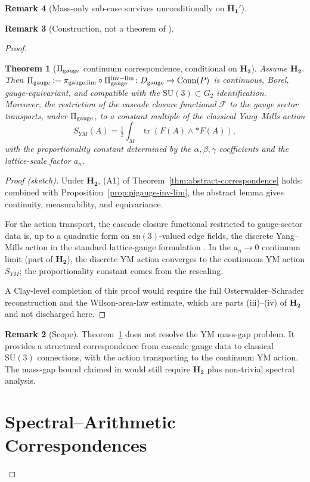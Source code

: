 \documentclass[11pt, a4paper]{amsart}
\newtheorem{theorem}{Theorem}[section]
\theoremstyle{definition}
\newtheorem{remark}[theorem]{Remark}
\newcommand{\gge}{{\rm gauge}}
\newcommand{\Conn}{\operatorname{Conn}}
\begin{document}
\begin{remark}[Mass-only sub-case survives unconditionally on $\mathbf{H_1'}$]
\begin{remark}[Construction, not a theorem of \cite{CascadeEmbeddings}]
\begin{proof}
\begin{theorem}[$\Pi_{\gge}$ continuum correspondence, conditional
on $\mathbf{H_2}$]
\label{thm:pigauge-cond}
Assume $\mathbf{H_2}$. Then
$\Pi_{\gge} := \pi_{\gge, {\rm lim}} \circ \Pi_{\gge}^{\rm inv-lim}
\colon D_{\gge} \to \Conn(P)$ is continuous, Borel,
gauge-equivariant, and compatible with the
$\mathrm{SU}(3) \subset G_2$ identification. Moreover, the
restriction of the cascade closure functional $\mathcal{F}$ to the
gauge sector transports, under $\Pi_{\gge}$, to a constant
multiple of the classical Yang--Mills action
\[
  S_{YM}(A) = \tfrac{1}{2} \int_M \operatorname{tr}(F(A) \wedge *F(A)),
\]
with the proportionality constant determined by the
$\alpha, \beta, \gamma$ coefficients and the lattice-scale factor
$a_n$.
\end{theorem}

\begin{proof}[Proof (sketch)]
Under $\mathbf{H_2}$, (A1) of
Theorem~\ref{thm:abstract-correspondence} holds; combined with
Proposition~\ref{prop:pigauge-inv-lim}, the abstract lemma gives
continuity, measurability, and equivariance.

For the action transport, the cascade closure functional
restricted to gauge-sector data is, up to a quadratic form on
$\mathfrak{su}(3)$-valued edge fields, the discrete Yang--Mills
action in the standard lattice-gauge formulation
\cite{WilsonLatticeGauge}. In the $a_n \to 0$ continuum limit
(part of $\mathbf{H_2}$), the discrete YM action converges to the
continuous YM action $S_{YM}$; the proportionality constant comes
from the rescaling.

A Clay-level completion of this proof would require the full
Osterwalder--Schrader reconstruction and the Wilson-area-law
estimate, which are parts (iii)--(iv) of $\mathbf{H_2}$ and not
discharged here.
\end{proof}

\begin{remark}[Scope]
Theorem~\ref{thm:pigauge-cond} does not resolve the YM mass-gap
problem. It provides a structural correspondence from cascade
gauge data to classical $\mathrm{SU}(3)$ connections, with the
action transporting to the continuum YM action. The mass-gap bound
claimed in \cite{MillenniumYM} would still require $\mathbf{H_2}$
plus non-trivial spectral analysis.
\end{remark}

\section{Spectral--Arithmetic Correspondences}
\label{sec:spectral}


\end{proof}
\end{remark}
\end{remark}
\end{document}
